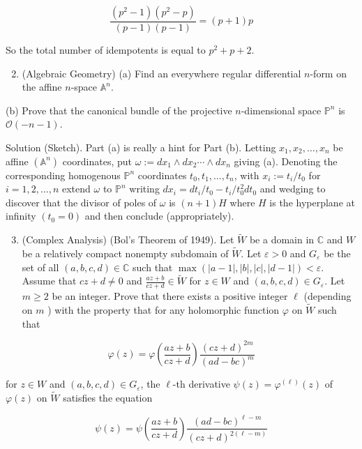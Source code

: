 \documentclass[10pt]{article}
\begin{document}
$$
\frac{\left(p^{2}-1\right)\left(p^{2}-p\right)}{(p-1)(p-1)}=(p+1) p
$$

So the total number of idempotents is equal to $p^{2}+p+2$.

\begin{enumerate}
  \setcounter{enumi}{1}
  \item (Algebraic Geometry) (a) Find an everywhere regular differential $n$-form on the affine $n$-space $\mathbb{A}^{n}$.
\end{enumerate}

(b) Prove that the canonical bundle of the projective $n$-dimensional space $\mathbb{P}^{n}$ is $\mathcal{O}(-n-1)$.

Solution (Sketch). Part (a) is really a hint for Part (b). Letting $x_{1}, x_{2}, \ldots, x_{n}$ be affine $\left(\mathbb{A}^{n}\right)$ coordinates, put $\omega:=d x_{1} \wedge d x_{2} \cdots \wedge d x_{n}$ giving (a). Denoting the corresponding homogenous $\mathbb{P}^{n}$ coordinates $t_{0}, t_{1}, \ldots, t_{n}$, with $x_{i}:=t_{i} / t_{0}$ for $i=1,2, \ldots, n$ extend $\omega$ to $\mathbb{P}^{n}$ writing $d x_{i}=d t_{i} / t_{0}-t_{i} / t_{0}^{2} d t_{0}$ and wedging to discover that the divisor of poles of $\omega$ is $(n+1) H$ where $H$ is the hyperplane at infinity $\left(t_{0}=0\right)$ and then conclude (appropriately).

\begin{enumerate}
  \setcounter{enumi}{2}
  \item (Complex Analysis) (Bol's Theorem of 1949). Let $\tilde{W}$ be a domain in $\mathbb{C}$ and $W$ be a relatively compact nonempty subdomain of $\tilde{W}$. Let $\varepsilon>0$ and $G_{\varepsilon}$ be the set of all $(a, b, c, d) \in \mathbb{C}$ such that $\max (|a-1|,|b|,|c|,|d-1|)<\varepsilon$. Assume that $c z+d \neq 0$ and $\frac{a z+b}{c z+d} \in \tilde{W}$ for $z \in W$ and $(a, b, c, d) \in G_{\varepsilon}$. Let $m \geq 2$ be an integer. Prove that there exists a positive integer $\ell$ (depending on $m$ ) with the property that for any holomorphic function $\varphi$ on $\tilde{W}$ such that
\end{enumerate}

$$
\varphi(z)=\varphi\left(\frac{a z+b}{c z+d}\right) \frac{(c z+d)^{2 m}}{(a d-b c)^{m}}
$$

for $z \in W$ and $(a, b, c, d) \in G_{\varepsilon}$, the $\ell$-th derivative $\psi(z)=\varphi^{(\ell)}(z)$ of $\varphi(z)$ on $\tilde{W}$ satisfies the equation

$$
\psi(z)=\psi\left(\frac{a z+b}{c z+d}\right) \frac{(a d-b c)^{\ell-m}}{(c z+d)^{2(\ell-m)}}
$$
\end{document}
